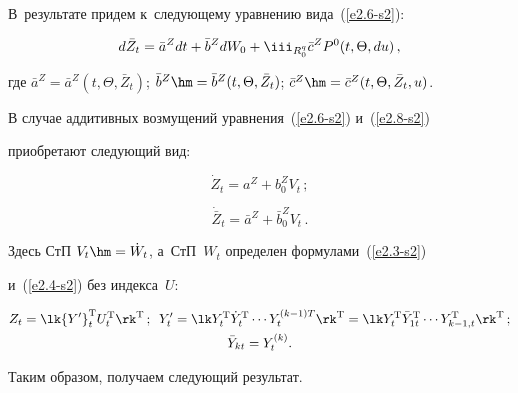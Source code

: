 В~результате придем к~следующему уравнению вида~(\ref{e2.6-s2}):

    \begin{equation}

    d\bar Z_t = \bar a^Z dt + \bar b^Z dW_0 + \iii_{R_0^q} 

    \bar c^Z P^0 (t,\Theta, du)\,,\label{e2.8-s2}

    \end{equation}

где $\bar a^Z = \bar a^Z(t,\Theta, \bar Z_t)$; $\bar b^Z \hm= \bar b^Z

(t,\Theta, \bar Z_t)$; $\bar c^Z\hm = \bar c^Z(t,\Theta, \bar Z_t, u)$.



В случае аддитивных возмущений уравнения~(\ref{e2.6-s2}) и~(\ref{e2.8-s2}) 

приобретают следующий вид:

\begin{equation}

\dot Z_t = a^Z + b_0^Z V_t\,;\label{e2.9-s2}

\end{equation}

\begin{equation}

\dot{\bar Z}_t = \bar a^Z + \bar b_0^Z V_t\,.\label{e2.10-s2}

\end{equation}

Здесь СтП $V_t \hm= \dot W_t$, а~СтП~$W_t$ определен формулами~(\ref{e2.3-s2}) 

и~(\ref{e2.4-s2})  без индекса~$U$:

    \begin{gather*}

    Z_t = \lk {Y'}_t^{\mathrm{T}} U_t^{\mathrm{T}} \rk^{\mathrm{T}}\,;\enskip 

    Y'_t = \lk Y_t^{\mathrm{T}}  \dot{Y}_t^{\mathrm{T}} \cdots Y_t^{(k-1)T}\rk^{\mathrm{T}} = 

   \lk Y_t^{\mathrm{T}} \bar Y_{1t}^{\mathrm{T}} \cdots 

   Y_{k-1,t}^{\mathrm{T}}\rk^{\mathrm{T}}\,;\\

 \bar Y_{kt} = Y_t^{(k)}.

    \end{gather*}



Таким образом, получаем следующий результат.



